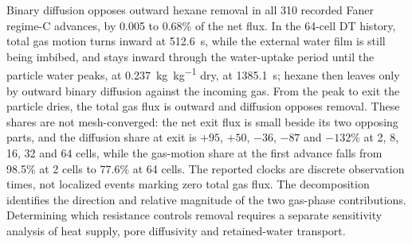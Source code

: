 Binary diffusion opposes outward hexane removal in all 310 recorded
Faner regime-C advances, by 0.005 to 0.68\% of the net flux. In the
64-cell DT history, total gas motion turns inward at 512.6~s, while the
external water film is still being imbibed, and stays inward through the
water-uptake period until the particle water peaks, at
\SI{0.237}{\kilogram\per\kilogram} dry, at 1385.1~s; hexane then leaves only
by outward binary diffusion against the incoming gas. From the peak to exit
the particle dries, the total gas flux is outward and diffusion opposes
removal. These shares are not mesh-converged: the net exit flux is small
beside its two opposing parts, and the diffusion share at exit is $+95$,
$+50$, $-36$, $-87$ and $-132$\% at 2, 8, 16, 32 and 64 cells, while the
gas-motion share at the first advance falls from 98.5\% at 2 cells to
77.6\% at 64 cells. The reported clocks are discrete observation times, not
localized events marking zero total gas flux. The decomposition identifies
the direction and relative magnitude of the two gas-phase contributions.
Determining which resistance controls removal requires a separate sensitivity
analysis of heat supply, pore diffusivity and retained-water transport.
